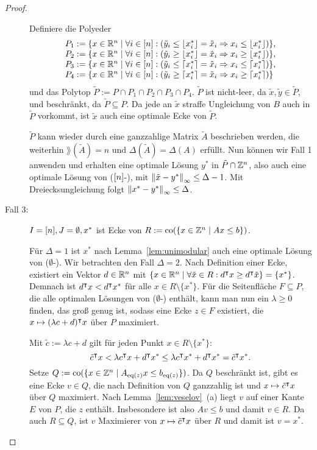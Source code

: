 \begin{proof}
\begin{description}
		Definiere die Polyeder
		$$
		\begin{array}{l}
		P_1:= \{ x\in\mathbb{R}^n \mid \forall i\in[n]: (\tilde{y}_i\leq \left\lfloor x^*_i \right\rfloor = \tilde{x}_i \Rightarrow x_i \leq \left\lfloor x^*_i \right\rfloor)\},\\
		P_2:= \{ x\in\mathbb{R}^n \mid \forall i\in[n]: (\tilde{y}_i\geq \left\lfloor x^*_i \right\rfloor = \tilde{x}_i \Rightarrow x_i \geq \left\lfloor x^*_i \right\rfloor)\}, \\
		P_3:= \{ x\in\mathbb{R}^n \mid \forall i\in[n]: (\tilde{y}_i\leq \left\lceil x^*_i \right\rceil = \tilde{x}_i \Rightarrow x_i \leq \left\lceil x^*_i \right\rceil)\},\\
		P_4:= \{ x\in\mathbb{R}^n \mid \forall i\in[n]: (\tilde{y}_i\geq \left\lceil x^*_i \right\rceil = \tilde{x}_i \Rightarrow x_i \geq \left\lceil x^*_i \right\rceil)\}
		\end{array}
		$$
		und das Polytop $\tilde{P}:=P\cap P_1 \cap P_2 \cap P_3 \cap P_4$.
		$\tilde{P}$ ist nicht-leer, da $\tilde{x}, \tilde{y}\in\tilde{P}$, und beschränkt, da $\tilde{P}\subseteq P$.
		Da jede an $\tilde{x}$ straffe Ungleichung von $B$ auch in $\tilde{P}$ vorkommt, ist $\tilde{x}$ auch eine optimale Ecke von $\tilde{P}$.
		
		$\tilde{P}$ kann wieder durch eine ganzzahlige Matrix $\tilde{A}$ beschrieben werden, die weiterhin $\rang(\tilde{A})=n$ und $\Delta(\tilde{A})=\Delta(A)$ erfüllt.
		Nun können wir Fall 1 anwenden und erhalten eine optimale Lösung $y^*$ in $\tilde{P}\cap\mathbb{Z}^n$, also auch eine optimale Lösung von ($[n]$-\MIPI), mit $\left\lVert\tilde{x} -y^*\right\rVert_\infty\leq \Delta -1$.
		Mit Dreiecksungleichung folgt $\left\lVert x^* - y^*\right\rVert_\infty\leq \Delta$.
		
		\item[Fall 3:] $I=[n],J=\emptyset,x^*$ ist Ecke von $R:=\operatorname{co}(\{ x\in\mathbb{Z}^n \mid Ax\leq b \})$.
		
		Für $\Delta=1$ ist $x^*$ nach Lemma~\ref{lem:unimodular} auch eine optimale Lösung von ($\emptyset$-\MIPI).
		Wir betrachten den Fall $\Delta=2$.
		Nach Definition einer Ecke, existiert ein Vektor $d\in\mathbb{R}^n$ mit $\{ x\in\mathbb{R}^n \mid \forall \tilde{x}\in R: d^\intercal x \geq d^\intercal\tilde{x} \}=\{x^*\}$.
		Demnach ist $d^\intercal x < d^\intercal x^*$ für alle $x\in R\setminus\{x^*\}$.
		Für die Seitenfläche $F\subseteq P$, die alle optimalen Lösungen von ($\emptyset$-\MIPI) enthält, kann man nun ein $\lambda\geq0$ finden, das groß genug ist, sodass eine Ecke $z\in F$ existiert, die $x\mapsto (\lambda c+d)^\intercal x$ über $P$ maximiert. 
		
		Mit $\tilde{c}:=\lambda c+d$ gilt für jeden Punkt $x\in R\setminus\{x^*\}$:
		$$\tilde{c}^\intercal x < \lambda c^\intercal x + d^\intercal x^*\leq \lambda c^\intercal x^* + d^\intercal x^* = \tilde{c}^\intercal x^*.$$
		Setze $Q:=\operatorname{co}(\{x\in\mathbb{Z}^n \mid A_{\operatorname{eq}(z)}x \leq b_{\operatorname{eq}(z)} \})$.
		Da $Q$ beschränkt  ist, gibt es eine Ecke $v\in Q$, die nach Definition von $Q$ ganzzahlig ist und $x\mapsto\tilde{c}^\intercal x$ über $Q$ maximiert.
		Nach Lemma~\ref{lem:veselov}~(a) liegt $v$ auf einer Kante $E$ von $P$, die $z$ enthält.
		Insbesondere ist also $Av\leq b$ und damit $v\in R$.
		Da auch $R \subseteq Q$, ist $v$ Maximierer von $x\mapsto \tilde{c}^\intercal x$ über $R$ und damit ist $v=x^*$.
		

\end{description}
\end{proof}
